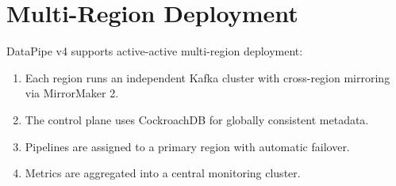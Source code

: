 \documentclass[
    language=english,
    doctype=technical-report,
    institution=none,
    titlestyle=book,
    oneside,
]{../../omnilatex}
\begin{document}
\section{Multi-Region Deployment}

DataPipe v4 supports active-active multi-region deployment:

\begin{enumerate}
    \item Each region runs an independent Kafka cluster with cross-region
        mirroring via MirrorMaker 2.
    \item The control plane uses CockroachDB for globally consistent
        metadata.
    \item Pipelines are assigned to a primary region with automatic
        failover.
    \item Metrics are aggregated into a central monitoring cluster.
\end{enumerate}

\printbibliography[heading=bibintoc, title={References}]
\end{document}
